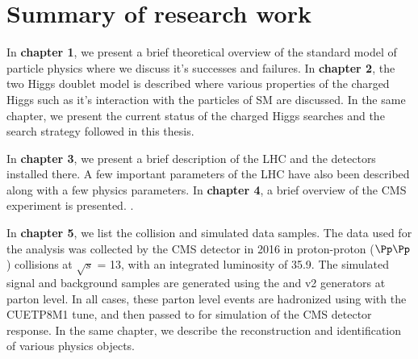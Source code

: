 \section*{Summary of research work}
In \textbf{chapter 1}, we present a brief theoretical overview of the standard model of
particle physics where we discuss it's successes and failures. In \textbf{chapter 2}, the
two Higgs doublet model is described where various properties of the charged Higgs such
as it's interaction with the particles of SM are discussed. In the same chapter,
we present the current status of the charged Higgs searches and the search strategy followed
in this thesis.

In \textbf{chapter 3}, we present a brief description of the LHC and the detectors
installed there. A few important parameters of the LHC have also been described along
with a few physics parameters. In \textbf{chapter 4}, a brief overview of the CMS
experiment is presented. . 

In \textbf{chapter 5}, we list the collision and simulated data samples. The data 
used for the analysis was collected by the CMS detector in 2016 in proton-proton 
($\Pp\Pp$) collisions at $\sqrt{s}$ = 13\TeV, with an integrated luminosity of 35.9\fbinv.  
The simulated signal and background samples are generated using the \MGvATNLO and \POWHEG v2 
generators at parton level. In all cases, these parton level events are hadronized 
using  with the CUETP8M1 tune, and then passed to \GEANTfour for simulation of 
the CMS detector response. In the same chapter, we describe the reconstruction and
identification of various physics objects.  

